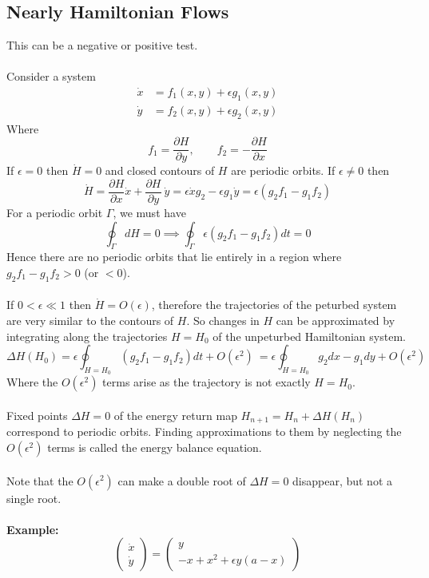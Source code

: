 \documentclass{article}
\newcommand{\example}{\textbf{Example:}}                    %
\begin{document}
\subsection{Nearly Hamiltonian Flows}
This can be a negative or positive test.
\\
\\
Consider a system 
\begin{align*}
\dot{x} &= f_1(x,y) + \epsilon g_1(x,y) \\
\dot{y} &= f_2(x,y) + \epsilon g_2(x,y) 
\end{align*}
Where
\[ f_1 = \frac{\partial H}{\partial y}, \qquad f_2 = -\frac{\partial H}{\partial x}\]
If $\epsilon =0$ then $\dot{H} = 0$ and closed contours of $H$ are periodic 
orbits. If $\epsilon \neq 0$ then 
\[\dot{H} = \frac{\partial H}{\partial x} \dot{x} + \frac{\partial H}{\partial y}\
\dot{y} = \epsilon \dot{x} g_2 - \epsilon g_1 \dot{y} = \epsilon(g_2f_1-g_1f_2) \]
For a periodic orbit $\Gamma$, we must have
\[ \oint_{\Gamma} dH = 0 \implies \oint_{\Gamma} \epsilon (g_2f_1 - g_1f_2) dt = 0\]
Hence there are no periodic orbits that lie entirely in a region where 
$g_2f_1 - g_1f_2 > 0$ (or $<0$).
\\
\\
If $0< \epsilon \ll 1$ then $\dot{H} = O(\epsilon)$, therefore the trajectories 
of the peturbed system are very similar to the contours of $H$.
So changes in $H$ can be approximated by integrating along the trajectories
$H=H_0$ of the unpeturbed Hamiltonian system.
\[ \Delta H(H_0) = \epsilon \oint_{H=H_0} (g_2 f_1 - g_1 f_2)dt + O(\epsilon ^2) \
= \epsilon \oint_{H=H_0} g_2dx - g_1dy + O(\epsilon^2) \]
Where the $O(\epsilon^2)$ terms arise as the trajectory is not exactly $H=H_0$.
\\
\\
Fixed points $\Delta H = 0$ of the energy return map 
$H_{n+1} = H_n + \Delta H(H_n)$ correspond to periodic orbits. Finding 
approximations to them by neglecting the $O(\epsilon^2)$ terms is called the 
energy balance equation.
\\
\\
Note that the $O(\epsilon^2)$ can make a double root of $\Delta H =0$ 
disappear, but not a single root.
\\
\\
\example\
\[ \left( \begin{array}{c} \dot{x} \\ \dot{y} \end{array} \right)
= \left( \begin{array}{c} y \\ -x+x^2 + \epsilon y(a-x) \end{array} \right) \]
\end{document}
